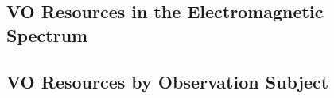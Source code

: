 \subsection{VO Resources in the Electromagnetic Spectrum}

\subsection{VO Resources by Observation Subject}


%
